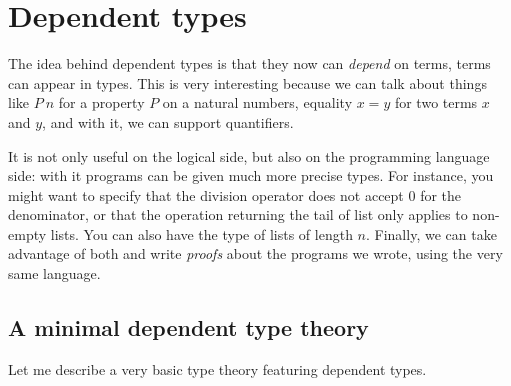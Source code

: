\chapter{Dependent types}

The idea behind dependent types is that they now can \emph{depend} on terms,
\ie terms can appear in types.
This is very interesting because we can talk about things like \(P\ n\) for a
property \(P\) on a natural numbers, equality \(x = y\) for two terms \(x\) and
\(y\), and with it, we can support quantifiers.

It is not only useful on the logical side, but also on the programming language
side: with it programs can be given much more precise types.
For instance, you might want to specify that the division operator does not
accept \(0\) for the denominator, or that the operation returning the tail of
list only applies to non-empty lists.
You can also have the type of lists of length \(n\).
Finally, we can take advantage of both and write \emph{proofs} about the
programs we wrote, using the very same language.

\section{A minimal dependent type theory}

Let me describe a very basic type theory featuring dependent types.


